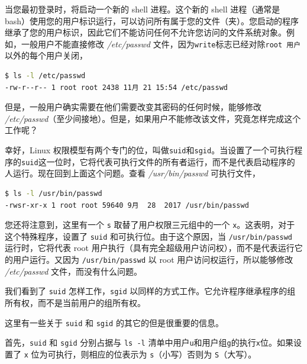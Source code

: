 \documentclass[doctor,openright,twoside]{sjtuthesis}
\newcommand{\passthrough}[1]{#1}
\theoremstyle{plain}
\theoremstyle{definition}
\theoremstyle{remark}
\theoremstyle{ocrenumbox}
\theoremstyle{plain}
\begin{document}
当您最初登录时，将启动一个新的 shell 进程。这个新的 shell 进程（通常是 bash）使用您的用户标识运行，可以访问所有属于您的文件（夹）。您启动的程序继承了您的用户标识，因此它们不能访问任何不允许您访问的文件系统对象。例如，一般用户不能直接修改 \emph{/etc/passwd} 文件，因为\passthrough{\lstinline!write!}标志已经对除\passthrough{\lstinline!root 用户!}以外的每个用户关闭，

\begin{lstlisting}[language=bash]
$ ls -l /etc/passwd
-rw-r--r-- 1 root root 2438 11月 21 15:54 /etc/passwd
\end{lstlisting}

但是，一般用户确实需要在他们需要改变其密码的任何时候，能够修改 \emph{/etc/passwd}（至少间接地）。但是，如果用户不能修改该文件，究竟怎样完成这个工作呢？

幸好，Linux 权限模型有两个专门的位，叫做\passthrough{\lstinline!suid!}和\passthrough{\lstinline!sgid!}。当设置了一个可执行程序的\passthrough{\lstinline!suid!}这一位时，它将代表可执行文件的所有者运行，而不是代表启动程序的人运行。现在回到上面这个问题。查看 \emph{/usr/bin/passwd} 可执行文件，

\begin{lstlisting}[language=bash]
$ ls -l /usr/bin/passwd
-rwsr-xr-x 1 root root 59640 9月  28  2017 /usr/bin/passwd
\end{lstlisting}

您还将注意到，这里有一个 \passthrough{\lstinline!s!} 取替了用户权限三元组中的一个 \passthrough{\lstinline!x!}。这表明，对于这个特殊程序，设置了 \passthrough{\lstinline!suid!} 和可执行位。由于这个原因，当 \passthrough{\lstinline!/usr/bin/passwd!} 运行时，它将代表 root 用户执行（具有完全超级用户访问权），而不是代表运行它的用户运行。又因为 \passthrough{\lstinline!/usr/bin/passwd!} 以 root 用户访问权运行，所以能够修改 \emph{/etc/passwd} 文件，而没有什么问题。

我们看到了 \passthrough{\lstinline!suid!} 怎样工作，\passthrough{\lstinline!sgid!} 以同样的方式工作。它允许程序继承程序的组所有权，而不是当前用户的组所有权。

这里有一些关于 \passthrough{\lstinline!suid!} 和 \passthrough{\lstinline!sgid!} 的其它的但是很重要的信息。

首先，\passthrough{\lstinline!suid!} 和 \passthrough{\lstinline!sgid!} 分别占据与 \passthrough{\lstinline!ls -l!} 清单中用户\passthrough{\lstinline!u!}和用户组\passthrough{\lstinline!g!}的执行\passthrough{\lstinline!x!}位。如果设置了 \passthrough{\lstinline!x!} 位为可执行，则相应的位表示为 \passthrough{\lstinline!s!}（小写）否则为 \passthrough{\lstinline!S!}（大写）。
\end{document}
